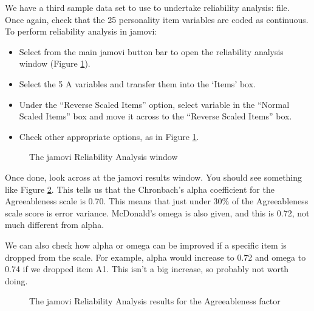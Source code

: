 
We have a third sample data set to use to undertake reliability analysis:  file. Once again, check that the 25 personality item variables are coded as continuous. To perform reliability analysis in jamovi:

\begin{itemize} \itemsep -2pt
\item Select  from the main jamovi button bar to open the reliability analysis window (Figure \ref{fig:rel1}).
\item Select the 5 A variables and transfer them into the ‘Items’ box.
\item Under the “Reverse Scaled Items” option, select variable  in the “Normal Scaled Items” box and move it across to the “Reverse Scaled Items” box. 
\item Check other appropriate options, as in Figure \ref{fig:rel1}.
\end{itemize}

\begin{figure}[!htb]
\begin{center}
\caption{The jamovi Reliability Analysis window}
\label{fig:rel1}
\HR
\end{center}
\end{figure}

Once done, look across at the jamovi results window. You should see something like Figure \ref{fig:rel2}. This tells us that the Chronbach’s alpha coefficient for the Agreeableness scale is 0.70. This means that just under 30\% of the Agreeableness scale score is error variance. McDonald’s omega is also given, and this is 0.72, not much different from alpha.

We can also check how alpha or omega can be improved if a specific item is dropped from the scale. For example, alpha would increase to 0.72 and omega to 0.74 if we dropped item A1. This isn’t a big increase, so probably not worth doing. 

\begin{figure}[!htb]
\begin{center}
\caption{The jamovi Reliability Analysis results for the Agreeableness factor}
\label{fig:rel2}
\HR
\end{center}
\end{figure}

